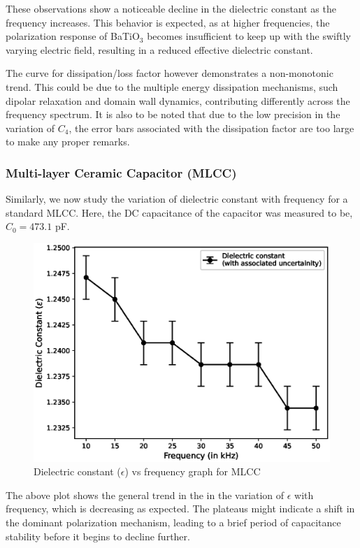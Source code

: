 	These observations show a
	noticeable decline in the dielectric constant as the
	frequency increases. This behavior is expected, as
	at higher frequencies, the polarization response of
	BaTiO$_3$ becomes insufficient to keep up with the
	swiftly varying electric field, resulting in a reduced
	effective dielectric constant.

	The curve for dissipation/loss factor however demonstrates a
	non-monotonic trend. This could be due to the multiple energy dissipation mechanisms, such dipolar relaxation and domain wall dynamics, contributing differently across the frequency spectrum. It is also to be noted that due to the low precision in the variation of $C_4$, the error bars associated with the dissipation factor are too large to make any proper remarks.

	\subsubsection{Multi-layer Ceramic Capacitor (MLCC)}

	\noindent Similarly, we now study the variation of dielectric constant with frequency for a standard MLCC. Here, the DC capacitance of the capacitor was measured to be, $C_0 = 473.1$ pF.

	
	\begin{figure}[H]
		\centering
		\label{graph:3}
		\includegraphics[width=1\columnwidth]{images/mlcc_e.eps}
		\caption{Dielectric constant ($\epsilon$) vs frequency graph for MLCC}
	\end{figure}
	The above plot shows the general trend in the in the variation of $\epsilon$ with frequency, which is decreasing as expected. The plateaus might indicate a shift in the dominant polarization mechanism, leading
	to a brief period of capacitance stability before it
	begins to decline further.

